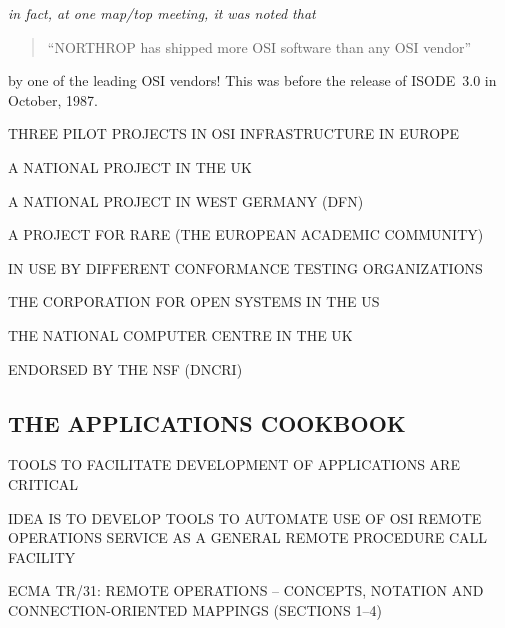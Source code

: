\begin{note}\em
in fact, at one map/top meeting, it was noted that

\begin{quote}
``NORTHROP has shipped more OSI software than any OSI vendor''
\end{quote}

by one of the leading OSI vendors!
This was before the release of ISODE~3.0 in October, 1987.
\end{note}


\begin{bwslide}

\begin{nrtc}
\item	THREE PILOT PROJECTS IN OSI INFRASTRUCTURE IN EUROPE
    \begin{nrtc}
    \item	A NATIONAL PROJECT IN THE UK

    \item	A NATIONAL PROJECT IN WEST GERMANY (DFN)

    \item	A PROJECT FOR RARE (THE EUROPEAN ACADEMIC COMMUNITY)
    \end{nrtc}

\item	IN USE BY DIFFERENT CONFORMANCE TESTING ORGANIZATIONS
    \begin{nrtc}
    \item	THE CORPORATION FOR OPEN SYSTEMS IN THE US

    \item	THE NATIONAL COMPUTER CENTRE IN THE UK
    \end{nrtc}

\item	ENDORSED BY THE NSF (DNCRI)
\end{nrtc}
\end{bwslide}


\begin{bwslide}
\part*	{THE APPLICATIONS COOKBOOK}\bf

\begin{nrtc}
\item	TOOLS TO FACILITATE DEVELOPMENT OF APPLICATIONS ARE CRITICAL

\item	IDEA IS TO DEVELOP TOOLS TO AUTOMATE USE OF OSI REMOTE OPERATIONS
	SERVICE AS A GENERAL REMOTE PROCEDURE CALL FACILITY

\item	ECMA TR/31: REMOTE OPERATIONS -- CONCEPTS, NOTATION AND
	CONNECTION-ORIENTED MAPPINGS (SECTIONS 1--4)
\end{nrtc}
\end{bwslide}


